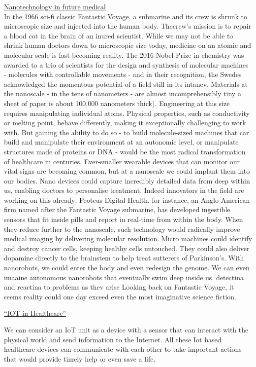 \documentclass[12pt]{article}
\begin{document}
\newpage
\huge{\underline{Nanotechnology in future medical}}
\large
\\
In the 1966 sci-fi classic Fantastic Voyage, a submarine and its crew is shrunk to microscopic size and injected into the human body. Thecrew's mission is to repair a blood cot in the brain of an inured scientist.
While we may not be able to shrink human doctors down to microscopic size today, medicine on an atomic and molecular scale is fast becoming reality. The 2016 Nobel Prize in chemistry was awarded to a trio of scientists for the design and synthesis of molecular machines -
molecules with controllable movements - and in their recognition, the Swedes acknowledged the momentous potential of a field still in its
intancv.
Materials at the nanoscale - in the tens of nanometers - are almost incomprehensibly tiny a sheet of paper is about 100,000 nanometers thick). Engineering at this size requires manipulating individual atoms. Physical properties, such as conductivity or melting point, behave differently, making it exceptionally challenging to work with. But gaining the ability to do so - to build molecule-sized machines that car build and manipulate their environment at an autonomic level, or manipulate structures made of proteins or DNA - would be the most
radical transformation of healthcare in centuries.
Ever-smaller wearable devices that can monitor our vital signs are becoming common, but at a nanoscale we could implant them into
our bodies. Nano devices could capture incredibly detailed data from deep within us, enabling doctors to personalise treatment. Indeed
innovators in the field are working on this already: Proteus Digital Health, for instance, an Anglo-American firm named after the Fantastic
Voyage submarine, has developed ingestible sensors that fit inside pills and report in real-time from within the body.
When they reduce further to the nanoscale, such technology would radically improve medical imaging by delivering molecular resolution.
Micro machines could identify and destroy cancer cells, keeping healthy cells untouched. They could also deliver dopamine directly to
the brainstem to help treat sutterers of Parkinson's. With nanorobots, we could enter the body and even redesign the genome.
We can even imaaine autonomous nanorobots that eventuallv swim deep inside us. detectina and reactina to problems as thev arise
Looking back on Fantastic Voyage, it seems reality could one day exceed even the most imaginative science fiction.

\huge{\underline{``IOT in Healthcare''}}\par
\Large
We can consider an IoT unit as a device with a sensor that can interact with the physical world and send information to the Internet. All these Iot based healthcare devices can communicate with each other to take important actions that would provide timely help or even save a life.
\end{document}
